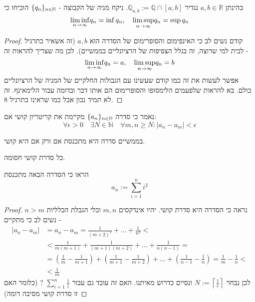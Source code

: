 \documentclass{article}
\begin{document}
\begin{exercise}
בהינתן 
$a,b\in\mathbb{R}$
נגדיר 
$\mathbb{Q}_{a,b} := \mathbb{Q}\cap [a, b]$.
ניקח מניה של הקבוצה - 
$\{q_n\}_{n\in\mathbb{N}}$
הוכיחו כי 
\[\underset{n\rightarrow\infty}{\liminf} q_n = \inf q_n, \quad \underset{n\rightarrow\infty}{\limsup} q_n=\sup q_n\]
\end{exercise}

\begin{proof}
קודם נשים לב כי האינפימום והסופרימום של הסדרה הוא 
$a, b$
(זה אשאיר כתרגיל לבית למי שרוצה, זה בגלל הצפיפות של הרציונליים בממשיים). לכן מה שצריך להראות זה - 
\[\underset{n\rightarrow\infty}{\liminf} q_n=a, \quad \underset{n\rightarrow\infty}{\limsup} q_n = b\]
אפשר לעשות את זה כמו קודם שעשינו עם הגבולות החלקיים של המניה של הרציונליים כולם. בא להראות שלפעמים הלימסופו והסופרימום הם אותו דבר ובדומה עבור הלימאינף. זה לא תמיד נכון אבל כמו שראינו בתרגיל 8.
\end{proof}

\begin{definition}
נאמר כי סדרה 
$\{a_n\}_{n\in\mathbb{N}}$
מקיימת את קריטריון קושי אם:
\[\forall\epsilon>0\quad\exists N\in\mathbb{N}\quad\forall m,n\geq N: |a_n-a_m|<\epsilon\]
\end{definition}

\begin{theorem}
בממשיים סדרה היא מתכנסת אם ורק אם היא קושי.
\end{theorem}

\begin{theorem}
כל סדרת קושי חסומה.
\end{theorem}

\begin{exercise}
הראו כי הסדרה הבאה מתכנסת 
\[a_n:=\sum_{i=1}^n i^2\]
\end{exercise}

\begin{proof}
נראה כי הסדרה היא סדרת קושי. יהיו אינדקסים
$m,n$
ובלי הגבלת הכלליות 
$n>m$
נשים לב כי מתקיים - 
\begin{align*}
|a_n-a_m| &= a_n-a_m  = \frac{1}{(m+2)^2}+\dots+\frac{1}{n^2} < \\ &< \frac{1}{m(m+1)} + \frac{1}{(m+1)(m+2)} + \dots + \frac{1}{n(n-1)} = \\ &= \left(\frac{1}{m}-\frac{1}{m+1}\right) + \left(\frac{1}{m+1}-\frac{1}{m+2}\right)+\dots + \left(\frac{1}{n-1}-\frac{1}{n}\right)= \frac{1}{m}-\frac{1}{n} < \\ &<\frac{1}{m}
\end{align*}
לכן נבחר 
$N:=\left\lceil \frac{1}{\epsilon}\right\rceil$ 
ונסיים כדרוש מאיתנו. האם זה עובד גם עבור 
$\sum_{i=1}^n \frac{1}{i}$
? (כלומר האם זו סדרת קושי מסיבה דומה)
\end{proof}
\end{document}
